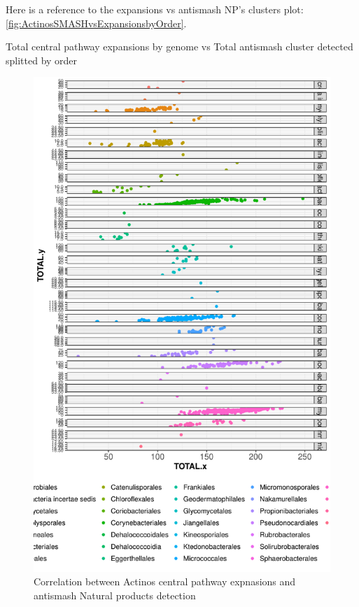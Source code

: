 \documentclass[12pt,twoside]{reedthesis}
\begin{document}
  Here is a reference to the expansions vs antismash NP's clusters plot:
  \autoref{fig:ActinosSMASHvsExpansionsbyOrder}. \clearpage 
  
  Total central pathway expansions by genome vs Total antismash cluster
  detected splitted by order
  
  \begin{figure}[h!tbp]
  \centering
  \includegraphics[angle = 0,scale = 0.5]{chapter2/Actinobacteria/ActinosSMASHvsExpansionsbyOrderGRID.pdf}
  \caption[Correlation between Actinos central pathway expnasions and antismash Natural products detection]{\normalsize{Correlation between Actinos central pathway expnasions and antismash Natural products detection}}
  \label{fig:ActinosSMASHvsExpansionsbyOrderGRID}
  \end{figure}
  
\end{document}
